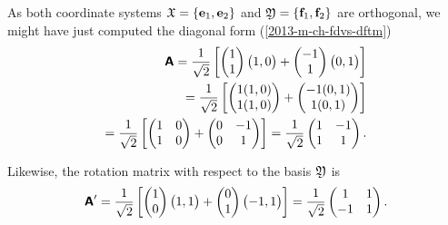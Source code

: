 {\begin{enumerate}
As both coordinate systems ${\frak X}
=
\{
{\bf e}_1,
{\bf e}_2
\}$
and
${\frak Y}
=  \{
{\bf f}_1,
{\bf f}_2
\}$ are orthogonal, we might have just computed
the diagonal form (\ref{2013-m-ch-fdvs-dftm})
\begin{equation}
\begin{split}
 \textsf{\textbf{A}}=
\frac{1}{\sqrt{2}}
\left[
\begin{pmatrix}
1\\
1
\end{pmatrix}
\begin{pmatrix}
1,0
\end{pmatrix}
+
\begin{pmatrix}
-1\\
1
\end{pmatrix}
\begin{pmatrix}
0,1
\end{pmatrix}
\right] \\
=
\frac{1}{\sqrt{2}}
\left[
\begin{pmatrix}
1(1,0)\\
1 (1,0)
\end{pmatrix}
+
\begin{pmatrix}
-1(0,1)\\
1(0,1)
\end{pmatrix}
\right] \\
=
\frac{1}{\sqrt{2}}
\left[
\begin{pmatrix}
1&0\\
1&0
\end{pmatrix}
+
\begin{pmatrix}
0&-1\\
0&1
\end{pmatrix}
\right]
=
\frac{1}{\sqrt{2}}
\begin{pmatrix}
1&-1\\
1&1
\end{pmatrix}
.
\end{split}
\end{equation}


Likewise, the rotation matrix with respect to the basis ${\frak Y}$  is
\begin{equation}
\begin{split}
 \textsf{\textbf{A}}'=
\frac{1}{\sqrt{2}}
\left[
\begin{pmatrix}
1\\
0
\end{pmatrix}
\begin{pmatrix}
1,1
\end{pmatrix}
+
\begin{pmatrix}
0\\
1
\end{pmatrix}
\begin{pmatrix}
-1,1
\end{pmatrix}
\right]
=
\frac{1}{\sqrt{2}}
\begin{pmatrix}
1&1\\
-1&1
\end{pmatrix}
.
\end{split}
\end{equation}




\end{enumerate}}
